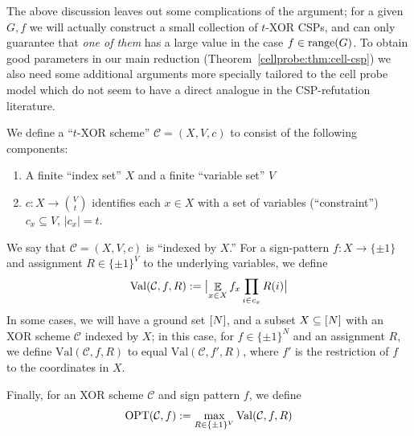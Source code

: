 The above discussion leaves out some complications of the argument; for a given $G,f$ we will actually construct a small collection of $t$-XOR CSPs, and can only guarantee that \emph{one of them} has a large value in the case $f \in \mathrm{range}(G)$. To obtain good parameters in our main reduction (Theorem~\ref{cellprobe:thm:cell-csp}) we also need some additional arguments more specially tailored to the cell probe model which do not seem to have a direct analogue in the CSP-refutation literature. 

\begin{definition}
We define a ``$t$-XOR scheme'' $\mathcal{C} = (X,V,c)$ to consist of the following components:
\begin{enumerate}
    \item A finite ``index set'' $X$ and a finite ``variable set'' $V$
    \item $c: X \to \binom{V}{t}$ identifies each $x \in X
    $ with a set of variables (``constraint'') $c_x \subseteq V$, $|c_x|=t$.
\end{enumerate}
We say that $\mathcal{C} = (X,V,c)$ is ``indexed by $X$.''
For a sign-pattern $f: X \to \{\pm 1\}$
and assignment $R \in \{\pm 1\}^V$ to the underlying variables,
we define
\[
\mathrm{Val}(\mathcal{C}, f,R):= \bigl|\mathop{\mathbb{E}}_{x \in X} f_x  \prod_{i \in c_x}R(i)\bigr|
\]
In some cases, we will have a ground set $[N]$, and a subset $X\subseteq [N]$ with an XOR scheme $\mathcal{C}$ indexed by $X$; in this case, for $f\in \{\pm 1\}^N$ and an assignment $R$, we define $\mathrm{Val}(\mathcal{C},f,R)$ to equal $\mathrm{Val}(\mathcal{C},f',R)$, where $f'$ is the restriction of $f$ to the coordinates in $X$.

Finally, for an XOR scheme $\mathcal{C}$ and sign pattern $f$, we define
\[
\mathrm{OPT}(\mathcal{C},f) := \max\limits_{R \in \{\pm 1\}^V} \mathrm{Val}(\mathcal{C},f,R)
\]

\end{definition}


